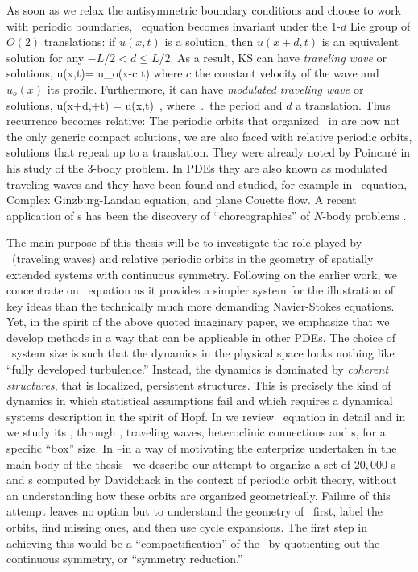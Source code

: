 As soon as we relax the antisymmetric boundary conditions and
choose to work with periodic boundaries, \KS\ equation
becomes invariant under the 1-$d$ Lie group of $O(2)$
translations: if $u(x,t)$ is a solution, then $u(x+d,t)$ is
an equivalent solution for any $-L/2 < d \leq L/2$. As a
result, KS can have \emph{traveling wave} or \emph{\reqv}
solutions,
\beq
 u(x,t)= u_o(x-c t)
\eeq
where $c$ the constant velocity of the wave and $u_o(x)$ its
profile. Furthermore, it can have \emph{modulated traveling
wave} or \emph{\rpo} solutions,
\beq
u(x+d,\period{}+t) = u(x,t)
\,,
where $\period{}$ the period and $d$ a translation.
Thus recurrence becomes
relative: The periodic orbits that organized \statesp\ in
 are now not the
only generic compact solutions, we are also faced with relative
periodic orbits, solutions that repeat up to a
translation.
They were already noted by Poincar\'e in his study of the
3-body problem. In PDEs they are also
known as modulated traveling waves and they have been found and
studied, for example in \KS\ equation, Complex
Ginzburg-Landau equation, and plane Couette
flow. A recent application of \rpo s has
been the discovery of ``choreographies'' of $N$-body problems%
.

The main purpose of this thesis will be to investigate the
role played by \reqva\ (traveling waves) and relative
periodic orbits in the geometry of spatially extended systems
with continuous symmetry. Following on the earlier work, we
concentrate on \KS\ equation as it provides a simpler system
for the illustration of key ideas than the technically much
more demanding Navier-Stokes equations. Yet, in the spirit of the
above quoted imaginary paper, we emphasize that we develop
methods in a way that can be applicable in other PDEs. The
choice of \KS\ system size is such that the dynamics in the
physical space looks nothing like ``fully developed
turbulence.'' Instead, the dynamics is dominated by
\emph{coherent structures}, that is localized,
persistent structures. This is precisely the kind of
dynamics in which statistical assumptions fail and
which requires a dynamical systems description in the spirit of
Hopf.
In  we review \KS\ equation in detail and in
 we study its \statesp, through \eqva,
traveling waves, heteroclinic connections and \rpo s, for a
specific ``box'' size.
In  --in a way of motivating the enterprize
undertaken in the main body of the thesis-- we describe our
attempt to organize a set of $20,000$ {\po s} and {\rpo s}
computed by Davidchack in the
context of periodic orbit theory, without an understanding how
these orbits are organized geometrically. Failure of this
attempt leaves no option but to understand the geometry of
\statesp\ first, label the orbits, find missing ones, and then
use cycle expansions. The first step in  achieving this would
be a ``compactification'' of the \statesp\ by quotienting out
the continuous symmetry, or ``symmetry reduction.''


